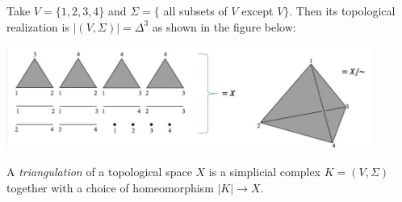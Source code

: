 \begin{example} Take \(V = \{ 1,2,3,4\}\) and \(\Sigma  = \{\) all subsets of \(V\) except \(V\}\). 
Then its topological realization is \(\left| \left( {V,\Sigma }\right) \right|  = {\Delta }^{3}\) as shown in the figure below:
\begin{center}
\includegraphics[width=0.9\textwidth]{images/Ch4_glue_3_simplex.jpg}
\end{center}
\end{example}

\begin{definition}[Triangulation] A \emph{triangulation} of a topological space \(X\) is a simplicial complex \(K = \left( {V,\Sigma }\right)\) together with a choice of homeomorphism \(\left| K\right|  \rightarrow  X\).
\end{definition}


